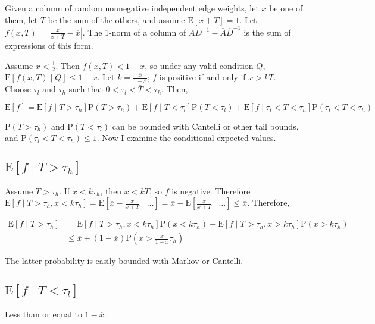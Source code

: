 \documentclass{article}
\newcommand \E[1] {\mathrm E \left[#1\right]} %
\newcommand \p[1] {\mathrm P \left(#1\right)}
\newcommand \inv [1] {{#1}^{-1}} %
\begin{document}
Given a column of random nonnegative independent edge weights, let $x$ be one of them, let $T$ be the sum of the others, and assume $\E{x+T}=1$. Let $f(x,T)=\left|\frac{x}{x+T}-\overline x\right|$. The 1-norm of a column of $A\inv D - \overline A\inv{\overline D}$ is the sum of expressions of this form.

Assume $\overline x < \frac 1 2$. Then $f(x,T)<1-\overline x$, so under any valid condition $Q$, $\E{f(x,T)\mid Q} \leq 1-\overline x$. Let $k=\frac{\overline x}{1-\overline x}$; $f$ is positive if and only if $x>kT$. Choose $\tau_l$ and $\tau_h$ such that $0<\tau_l<\overline T<\tau_h$. Then,

\begin{equation*}
\E{f} = \E{f\mid T>\tau_h}\p{T>\tau_h} + \E{f\mid T<\tau_l}\p{T<\tau_l} + \E{f\mid \tau_l<T<\tau_h}\p{\tau_l<T<\tau_h}
\end{equation*}

$\p{T>\tau_h}$ and $\p{T<\tau_l}$ can be bounded with Cantelli or other tail bounds, and $\p{\tau_l<T<\tau_h} \leq 1$. Now I examine the conditional expected values.

\subsection{$\E{f\mid T>\tau_h}$}

Assume $T>\tau_h$. If $x<  k\tau_h$, then $x<kT$, so $f$ is negative. Therefore $\E{f\mid T>\tau_h, x<k\tau_h} = \E{\overline x - \frac{x}{x+T} \mid \ldots} = \overline x - \E{\frac{x}{x+T}\mid\ldots} \leq \overline x$. Therefore,

\begin{align*}
\E{f\mid T>\tau_h} &= \E{f\mid T>\tau_h, x<k\tau_h}\p{x<k\tau_h} + \E{f\mid T>\tau_h, x>k\tau_h}\p{x>k\tau_h} \\
&\leq \overline x + (1-\overline x)\p{x>\frac{\overline x}{1-\overline x}\tau_h}
\end{align*}

The latter probability is easily bounded with Markov or Cantelli.

\subsection{$\E{f\mid T<\tau_l}$}

Less than or equal to $1-\overline x$.

\end{document}
